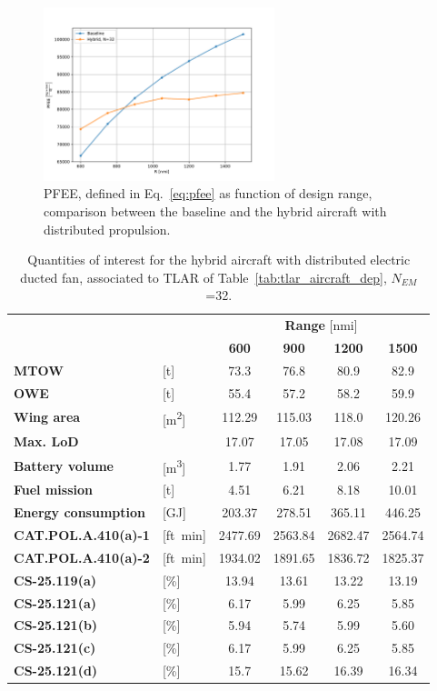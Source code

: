 \begin{figure}[!h]
	\centering
	\includegraphics[keepaspectratio, width=0.6\textwidth]{images/chap3/hybrid_dep_non_optim_pfee_comp}
	\caption{PFEE, defined in Eq.~\eqref{eq:pfee} as function of design range, comparison between the baseline and the hybrid aircraft with distributed propulsion.}
	\label{fig:hybrid_dep_non_optim_pfee_comp}
\end{figure}
\begin{table}[!h]
	\centering
	\begin{tabular}{l l c c c c}
		\cline{3-6}
		& & \multicolumn{4}{c}{\textbf{Range} [nmi]} \\
		& & \textbf{600} & \textbf{900} & \textbf{1200} & \textbf{1500} \\
		\hline
		\textbf{MTOW} & [\si{\tonne}] & 73.3 & 76.8 & 80.9 & 82.9 \\
		\textbf{OWE} & [\si{\tonne}] & 55.4 & 57.2 & 58.2 & 59.9  \\
		\textbf{Wing area} & [\si{\square\meter}] & 112.29 & 115.03 & 118.0 & 120.26 \\
		\textbf{Max. LoD} & & 17.07 & 17.05 & 17.08 & 17.09 \\
		\textbf{Battery volume} & [\si{\cubic\meter}] & 1.77 & 1.91 & 2.06 & 2.21 \\
		\textbf{Fuel mission} & [\si{\tonne}] & 4.51 & 6.21 & 8.18 & 10.01 \\
		\textbf{Energy consumption} & [\si{\giga\joule}] & 203.37 & 278.51 & 365.11 & 446.25 \\
		\hline
		\textbf{CAT.POL.A.410(a)-1} & [ft\si{\per\minute}] & 2477.69 & 2563.84 & 2682.47 & 2564.74 \\
		\textbf{CAT.POL.A.410(a)-2} & [ft\si{\per\minute}] & 1934.02 & 1891.65 & 1836.72 & 1825.37 \\
		\textbf{CS-25.119(a)} & [\%] & 13.94 & 13.61 & 13.22 & 13.19 \\
		\textbf{CS-25.121(a)} & [\%] & 6.17 & 5.99 & 6.25 & 5.85 \\
		\textbf{CS-25.121(b)} & [\%] & 5.94 & 5.74 & 5.99 & 5.60 \\
		\textbf{CS-25.121(c)} & [\%] & 6.17 & 5.99 & 6.25 & 5.85 \\
		\textbf{CS-25.121(d)} & [\%] & 15.7 & 15.62 & 16.39 & 16.34 \\
		\hline
	\end{tabular}
	\caption{Quantities of interest for the hybrid aircraft with distributed electric ducted fan, associated to TLAR of Table~\ref{tab:tlar_aircraft_dep}, $N_{EM}$=32.}
	\label{tab:hybrid_dep_non_optim_res}
\end{table}
